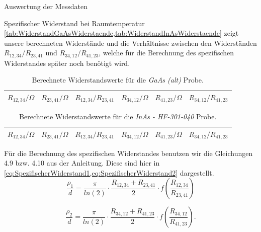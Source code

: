 \documentclass[pdftex, a4paper,11pt, twoside, ngerman]{report}
\begin{document}
\begin{chapter}{Auswertung der Messdaten}
\begin{section}{Spezifischer Widerstand bei Raumtemperatur}
      \cref{tab:WiderstandGaAsWiderstaende,tab:WiderstandInAsWiderstaende}
      zeigt unsere berechneten Widerstände und die Verhältnisse zwischen den
      Widerständen $R_{12,34}/R_{23,41}$ und $R_{34,12}/R_{41,23}$, welche für
      die Berechnung des spezifischen Widerstandes später noch benötigt wird.
      \begin{table}[htbp]
        \centering
        \footnotesize
        \begin{tabular}{ccc|ccc}
          $R_{12,34} /\Omega$ & $R_{23,41} /\Omega$ &
          $R_{12,34} / R_{23,41}$ &
          $R_{34,12} /\Omega$ & $R_{41,23} /\Omega$ &
          $R_{34,12} / R_{41,23}$ \\ \hline \hline
          
        \end{tabular}
        \caption{Berechnete Widerstandswerte für die \textit{GaAs (alt)} Probe.}
        \label{tab:WiderstandGaAsWiderstaende}
      \end{table}
      \begin{table}[htbp]
        \centering
        \footnotesize
        \begin{tabular}{ccc|ccc}
          $R_{12,34} /\Omega$ & $R_{23,41} /\Omega$ &
          $R_{12,34} / R_{23,41}$ &
          $R_{34,12} /\Omega$ & $R_{41,23} /\Omega$ &
          $R_{34,12} / R_{41,23}$ \\ \hline \hline
          
        \end{tabular}
        \caption{Berechnete Widerstandswerte für die 
            \textit{InAs - HF-301-040} Probe.}
        \label{tab:WiderstandInAsWiderstaende}
      \end{table}
      
      Für die Berechnung des spezifischen Widerstandes benutzen wir die
      Gleichungen 4.9 bzw. 4.10 aus der Anleitung.
      Diese sind hier in
      \cref{eq:SpezifischerWiderstand1,eq:SpezifischerWiderstand2} dargestellt.
      \begin{equation}
        \label{eq:SpezifischerWiderstand1}
        \frac{\rho_{1}}{d} = \frac{\pi}{ln(2)}\cdot
        \frac{R_{12,34}+R_{23,41}}{2}
        \cdot f\left(\frac{R_{12,34}}{R_{23,41}} \right)
      \end{equation}
      
      \begin{equation}
        \label{eq:SpezifischerWiderstand2}
        \frac{\rho_{2}}{d} = \frac{\pi}{ln(2)}\cdot
        \frac{R_{34,12}+R_{41,23}}{2}
        \cdot f\left(\frac{R_{34,12}}{R_{41,23}} \right).
      \end{equation}
      

\end{section}
\end{chapter}
\end{document}
